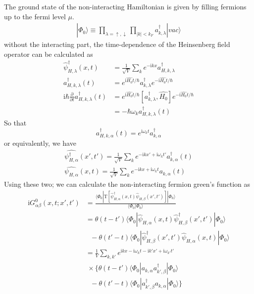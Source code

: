 ﻿\documentclass[twoside]{book}
\numberwithin{equation}{section}
\begin{document}
The ground state of the non-interacting Hamiltonian is given by filling fermions up to the fermi level $\mu$.
\begin{align}
|\Phi_0\rangle \equiv \prod_{\lambda=\uparrow,\downarrow}\prod_{|k|<k_F} a^{\dagger}_{k,\lambda}|vac\rangle \nonumber
\end{align}
without the interacting  part, the time-dependence of the Heinsenberg field operator can be calculated as
\begin{align}
\hat\psi^{\dagger}_{H,\lambda}(x,t)&=\frac{1}{\sqrt{V}}\sum_{k}e^{-\mathrm{i}kx}a_{H,k,\lambda}^{\dagger}\nonumber \\
a_{H,k,\lambda}^{\dagger}(t)&=e^{\mathrm{i}\hat{H_0}t/\hbar}a_{k,\lambda}^{\dagger}e^{-\mathrm{i}\hat{H_0}t/\hbar}\nonumber \\
\mathrm{i}\hbar \frac{\partial}{\partial  t} a_{H,k,\lambda}^{\dagger}(t)&=e^{\mathrm{i}\hat{H_0}t/\hbar}[a_{k,\lambda}^{\dagger},\hat{H_0}]e^{-\mathrm{i}\hat{H_0}t/\hbar}\nonumber \\
&=-\hbar \omega_k a_{H,k,\lambda}^{\dagger}(t) \nonumber
\end{align}
So that
\begin{equation}
a^{\dagger}_{H,k,\alpha}(t)=e^{\mathrm{i}\omega_{k}t}a^{\dagger}_{k,\alpha} \nonumber
\end{equation}
or equivalently, we have 
\begin{align}\label{2.3.5}
\hat{\psi_{H,\alpha}^{\dagger}}(x',t')=\frac{1}{\sqrt{V}}\sum_{k}e^{-\mathrm{i}kx'+\mathrm{i}\omega_kt'}a^{\dagger}_{k,\alpha}(t) \nonumber \\
\hat{\psi_{H,\alpha}}(x,t)=\frac{1}{\sqrt{V}}\sum_{k}e^{-\mathrm{i}kx+\mathrm{i}\omega_kt}a_{k,\alpha}(t)
\end{align}
Using these two; we can calculate the non-interacting fermion green's function as
\begin{align}
\mathrm{i}G^0_{\alpha\beta}(x,t;x',t')&=\frac{\langle\Phi_0|\mathrm{T}[\hat \psi^{
\dagger}_{H,\alpha}(x,t)\hat \psi_{H,\beta} (x',t')]|\Phi_0\rangle}{\langle\Phi_0|\Phi_0\rangle} \nonumber \\
&=\theta(t-t')\langle\Phi_0|\hat \psi_{H,\alpha}(x,t)\hat \psi^{
\dagger}_{H,\beta} (x',t')|\Phi_0\rangle \nonumber \\
& \ \ \ -\theta(t'-t)\langle\Phi_0|\hat \psi^{
\dagger}_{H,\beta}(x',t')\hat \psi_{H,\alpha} (x,t)|\Phi_0\rangle \nonumber \\
&=\frac{1}{V}\sum_{k,k'}e^{\mathrm{i}kx-\mathrm{i}\omega_kt-\mathrm{i}k'x'+\mathrm{i}\omega_{k'}t'} \nonumber \\
&\  \times\{\theta(t-t')\langle\Phi_0|a_{k,\alpha}a^{\dagger}_{k',\beta}|\Phi_0\rangle \nonumber \\
& \ \ \ -\theta(t'-t)\langle\Phi_0|a^{\dagger}_{k',\beta}a_{k,\alpha}|\Phi_0\rangle \} \nonumber 
\end{align}
\end{document}
